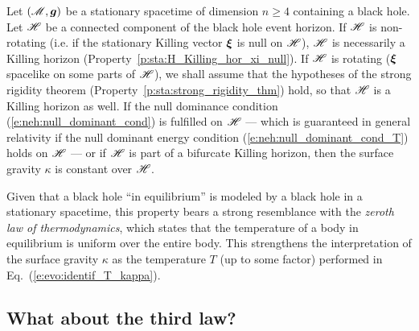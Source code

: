 \begin{prop}
\label{p:evo:zeroth_law}
Let $(\mathscr{M},\bm{g})$ be a stationary spacetime of dimension $n\geq 4$
containing a black hole.
Let $\mathscr{H}$ be a connected component of the black hole event horizon.
If $\mathscr{H}$ is non-rotating (i.e. if the stationary Killing vector $\bm{\xi}$ is null
on $\mathscr{H}$), $\mathscr{H}$ is necessarily a Killing horizon (Property~\ref{p:sta:H_Killing_hor_xi_null}).
If $\mathscr{H}$ is rotating
($\bm{\xi}$ spacelike on some parts of $\mathscr{H}$),
we shall assume that the hypotheses of the strong rigidity theorem
(Property~\ref{p:sta:strong_rigidity_thm}) hold, so that $\mathscr{H}$ is a Killing horizon as well.
If the null dominance condition (\ref{e:neh:null_dominant_cond})
is fulfilled on $\mathscr{H}$  --- which is guaranteed in general relativity
if the null dominant energy condition (\ref{e:neh:null_dominant_cond_T}) holds on $\mathscr{H}$ ---
or if $\mathscr{H}$ is part of a bifurcate Killing horizon,
then the surface gravity $\kappa$ is constant over $\mathscr{H}$.
\end{prop}

Given that a black hole ``in equilibrium'' is modeled by a black hole in
a stationary spacetime,
this property bears a strong resemblance with
the \emph{zeroth law of thermodynamics}, which states that the temperature of a body in equilibrium
is uniform over the entire body.
This strengthens the interpretation of the surface gravity
$\kappa$ as the temperature $T$ (up to some factor) performed in
Eq.~(\ref{e:evo:identif_T_kappa}).


\subsection{What about the third law?} \label{s:evo:third_law}

